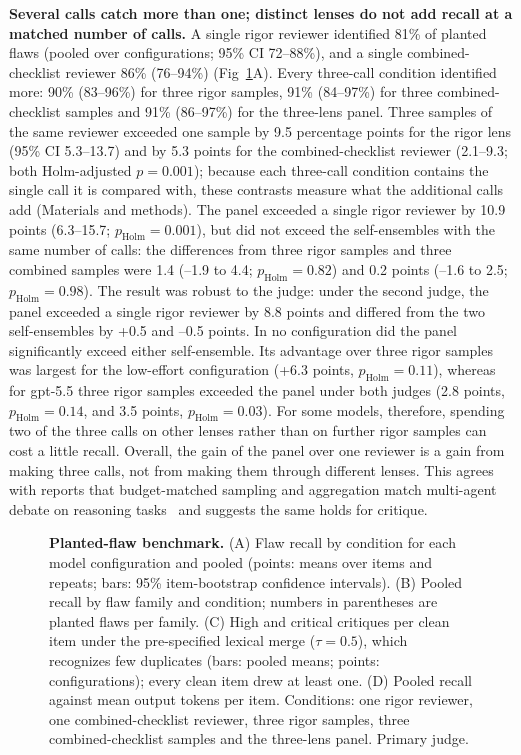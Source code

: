 \documentclass[10pt,letterpaper]{article}
\begin{document}
\textbf{Several calls catch more than one; distinct lenses do not add recall at a matched number of calls.} A single rigor reviewer identified 81\% of planted flaws (pooled over configurations; 95\% CI 72--88\%), and a single combined-checklist reviewer 86\% (76--94\%) (Fig~\ref{fig2}A). Every three-call condition identified more: 90\% (83--96\%) for three rigor samples, 91\% (84--97\%) for three combined-checklist samples and 91\% (86--97\%) for the three-lens panel. Three samples of the same reviewer exceeded one sample by 9.5 percentage points for the rigor lens (95\% CI 5.3--13.7) and by 5.3 points for the combined-checklist reviewer (2.1--9.3; both Holm-adjusted $p=0.001$); because each three-call condition contains the single call it is compared with, these contrasts measure what the additional calls add (Materials and methods). The panel exceeded a single rigor reviewer by 10.9 points (6.3--15.7; $p_\mathrm{Holm}=0.001$), but did not exceed the self-ensembles with the same number of calls: the differences from three rigor samples and three combined samples were 1.4 (--1.9 to 4.4; $p_\mathrm{Holm}=0.82$) and 0.2 points (--1.6 to 2.5; $p_\mathrm{Holm}=0.98$). The result was robust to the judge: under the second judge, the panel exceeded a single rigor reviewer by 8.8 points and differed from the two self-ensembles by +0.5 and --0.5 points. In no configuration did the panel significantly exceed either self-ensemble. Its advantage over three rigor samples was largest for the low-effort configuration (+6.3 points, $p_\mathrm{Holm}=0.11$), whereas for gpt-5.5 three rigor samples exceeded the panel under both judges (2.8 points, $p_\mathrm{Holm}=0.14$, and 3.5 points, $p_\mathrm{Holm}=0.03$). For some models, therefore, spending two of the three calls on other lenses rather than on further rigor samples can cost a little recall. Overall, the gain of the panel over one reviewer is a gain from making three calls, not from making them through different lenses. This agrees with reports that budget-matched sampling and aggregation match multi-agent debate on reasoning tasks~\cite{wang2023selfconsistency,li2024moreagents,smit2024mad} and suggests the same holds for critique.

\begin{figure}[!h]
\caption{{\bf Planted-flaw benchmark.}
(A) Flaw recall by condition for each model configuration and pooled (points: means over items and repeats; bars: 95\% item-bootstrap confidence intervals). (B) Pooled recall by flaw family and condition; numbers in parentheses are planted flaws per family. (C) High and critical critiques per clean item under the pre-specified lexical merge ($\tau=0.5$), which recognizes few duplicates (bars: pooled means; points: configurations); every clean item drew at least one. (D) Pooled recall against mean output tokens per item. Conditions: one rigor reviewer, one combined-checklist reviewer, three rigor samples, three combined-checklist samples and the three-lens panel. Primary judge.}
\label{fig2}
\end{figure}
\end{document}
